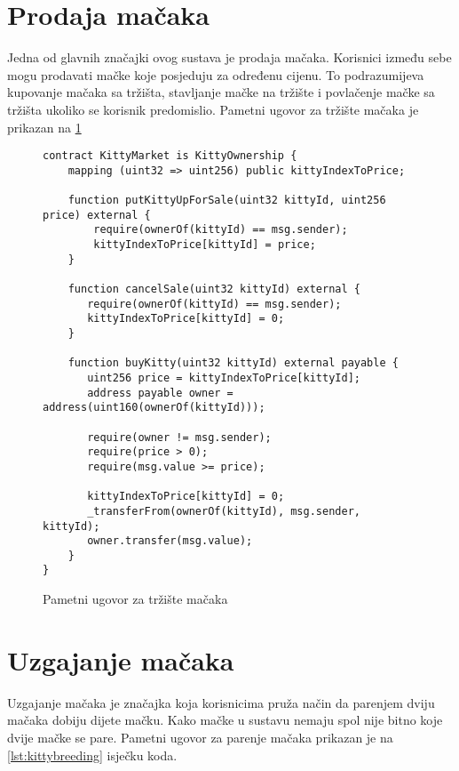 \documentclass[times, utf8, tehnicka_dokumentacija]{fer}
\begin{document}
\section{Prodaja mačaka}
Jedna od glavnih značajki ovog sustava je prodaja mačaka. Korisnici između sebe mogu prodavati mačke koje posjeduju za
određenu cijenu. To podrazumijeva kupovanje mačaka sa tržišta, stavljanje mačke na tržište i povlačenje mačke sa tržišta
ukoliko se korisnik predomislio. Pametni ugovor za tržište mačaka je prikazan na \ref{lst:kittymarket}

\begin{figure}
\begin{lstlisting}
contract KittyMarket is KittyOwnership {
    mapping (uint32 => uint256) public kittyIndexToPrice;

    function putKittyUpForSale(uint32 kittyId, uint256 price) external {
        require(ownerOf(kittyId) == msg.sender);
        kittyIndexToPrice[kittyId] = price;
    }

    function cancelSale(uint32 kittyId) external {
       require(ownerOf(kittyId) == msg.sender);
       kittyIndexToPrice[kittyId] = 0;
    }

    function buyKitty(uint32 kittyId) external payable {
       uint256 price = kittyIndexToPrice[kittyId];
       address payable owner = address(uint160(ownerOf(kittyId)));

       require(owner != msg.sender);
       require(price > 0);
       require(msg.value >= price);

       kittyIndexToPrice[kittyId] = 0;
       _transferFrom(ownerOf(kittyId), msg.sender, kittyId);
       owner.transfer(msg.value);
    }
}
\end{lstlisting}
\caption{Pametni ugovor za tržište mačaka}
\label{lst:kittymarket}
\end{figure}

\section{Uzgajanje mačaka}
Uzgajanje mačaka je značajka koja korisnicima pruža način da parenjem dviju mačaka dobiju dijete mačku. Kako mačke u
sustavu nemaju spol nije bitno koje dvije mačke se pare. Pametni ugovor za parenje mačaka prikazan je na
\ref{lst:kittybreeding} isječku koda.
\end{document}
